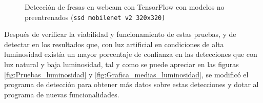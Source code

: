 \begin{figure}[H]
    \hspace{1mm}
    \hspace{1mm}
    
    \caption{Detección de fresas en webcam con TensorFlow con modelos no preentrenados (\texttt{ssd mobilenet v2 320x320)}}
    \label{fig:deteccion_Fresas_webcam_TF_ssdmobilenet}
\end{figure}

Después de verificar la viabilidad y funcionamiento de estas pruebas, y de detectar en los resultados que, con luz artificial en condiciones de alta luminosidad existía un mayor porcentaje de confianza en las detecciones que con luz natural y baja luminosidad, tal y como se puede apreciar en las figuras \ref{fig:Pruebas_luminosidad} y \ref{fig:Grafica_medias_luminosidad}, se modificó el programa de detección para obtener más datos sobre estas detecciones y dotar al programa de nuevas funcionalidades.

